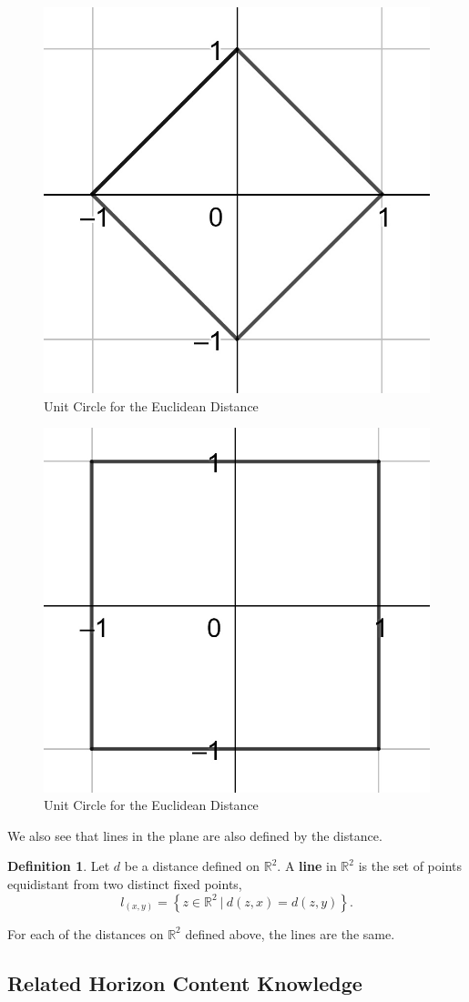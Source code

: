 \documentclass[
]{book}
\theoremstyle{definition}
\newtheorem{definition}{Definition}[chapter]
\theoremstyle{definition}
\theoremstyle{definition}
\theoremstyle{definition}
\theoremstyle{remark}
\begin{document}
\begin{figure}

{\centering \includegraphics[width=0.3\linewidth]{images/circle-taxi} 

}

\caption{Unit Circle for the Euclidean Distance}\label{fig:taxi-circle}
\end{figure}

\begin{figure}

{\centering \includegraphics[width=0.3\linewidth]{images/circle-Chebechev} 

}

\caption{Unit Circle for the Euclidean Distance}\label{fig:chebechev-circle}
\end{figure}

We also see that lines in the plane are also defined by the distance.

\begin{definition}
Let \(d\) be a distance defined on \(\mathbb{R}^2\). A \textbf{line} in \(\mathbb{R}^2\) is the set of points equidistant from two distinct fixed points,
\[l_{(x,y)} = \left\{ z\in \mathbb{R}^2 \: \vert \: d(z,x)=d(z,y)\right\}.\]
\end{definition}

For each of the distances on \(\mathbb{R}^2\) defined above, the lines are the same.

\hypertarget{related-horizon-content-knowledge-1}{%
\subsection{Related Horizon Content Knowledge}\label{related-horizon-content-knowledge-1}}
\end{document}
